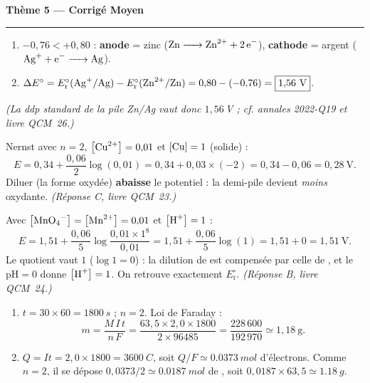 \documentclass[11pt,a4paper]{article}
\newcommand{\Ered}{\ensuremath{E_{\mathrm{r}}^{\circ}}}
\newcommand{\fem}{\ensuremath{\Delta E}}
\newcommand{\cc}[1]{\left[#1\right]}
\begin{document}
\begin{center}
{\LARGE\bfseries\color{primarydark}Thème 5 — Corrigé Moyen}\\[-2pt]
{\color{corrcol}\rule{\textwidth}{1pt}}
\end{center}

\begin{corr}
\begin{enumerate}[label=(\alph*),leftmargin=2em,topsep=1pt,itemsep=1.5pt]
  \item $-0{,}76<+0{,}80$ : \textbf{anode} = zinc ($\ce{Zn -> Zn^{2+} + 2 e^-}$),
        \textbf{cathode} = argent ($\ce{Ag+ + e^- -> Ag}$).
  \item $\fem^{\circ}=\Ered(\ce{Ag+}/\ce{Ag})-\Ered(\ce{Zn^{2+}}/\ce{Zn})=0{,}80-(-0{,}76)=\boxed{1{,}56\ \mathrm{V}}$.
\end{enumerate}
\emph{(La ddp standard de la pile Zn/Ag vaut donc $1{,}56$\,V ; cf. annales 2022-Q19 et livre QCM~26.)}
\end{corr}

\begin{corr}
Nernst avec $n=2$, $\cc{\ce{Cu^{2+}}}=0{,}01$ et $\cc{\ce{Cu}}=1$ (solide) :
\[
E = 0{,}34 + \frac{0{,}06}{2}\log(0{,}01) = 0{,}34 + 0{,}03\times(-2) = 0{,}34 - 0{,}06 = \boxed{0{,}28\ \mathrm{V}}.
\]
Diluer  (la forme oxydée) \textbf{abaisse} le potentiel : la demi-pile devient
\emph{moins} oxydante. \emph{(Réponse C, livre QCM~23.)}
\end{corr}

\begin{corr}
Avec $\cc{\ce{MnO4^-}}=\cc{\ce{Mn^{2+}}}=0{,}01$ et $\cc{\ce{H+}}=1$ :
\[
E = 1{,}51 + \frac{0{,}06}{5}\log\frac{0{,}01\times 1^{8}}{0{,}01}
= 1{,}51 + \frac{0{,}06}{5}\log(1) = 1{,}51 + 0 = \boxed{1{,}51\ \mathrm{V}}.
\]
Le quotient vaut $1$ ($\log 1 = 0$) : la dilution de  est compensée par celle de
, et le pH$=0$ donne $\cc{\ce{H+}}=1$. On retrouve exactement \Ered.
\emph{(Réponse B, livre QCM~24.)}
\end{corr}

\begin{corr}
\begin{enumerate}[label=(\alph*),leftmargin=2em,topsep=1pt,itemsep=1.5pt]
  \item $t = 30\times 60 = \SI{1800}{s}$ ; $n=2$. Loi de Faraday :
        \[
        m = \frac{M\,I\,t}{n\,F} = \frac{63{,}5\times 2{,}0\times 1800}{2\times 96485}
        = \frac{228\,600}{192\,970} \simeq \boxed{1{,}18\ \mathrm{g}}.
        \]
  \item $Q = It = 2{,}0\times 1800 = \SI{3600}{C}$, soit $Q/F \simeq \SI{0.0373}{mol}$ d'électrons.
        Comme $n=2$, il se dépose $0{,}0373/2 \simeq \SI{0.0187}{mol}$ de , soit
        $0{,}0187\times 63{,}5 \simeq \SI{1.18}{g}$. \checkmark
\end{enumerate}
\end{corr}
\end{document}
